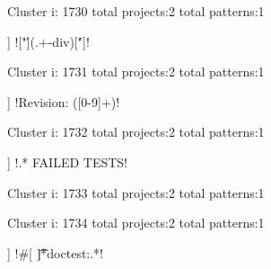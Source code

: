 Cluster i: 1730
total projects:2
total patterns:1
\begin{multicols}{1}
\begin{description}[noitemsep,topsep=0pt]
\item [[2] ] \cverb!["\'](.+-div)[\'"]!
\end{description}
\end{multicols}







Cluster i: 1731
total projects:2
total patterns:1
\begin{multicols}{1}
\begin{description}[noitemsep,topsep=0pt]
\item [[2] ] \cverb!Revision: ([0-9]+)!
\end{description}
\end{multicols}







Cluster i: 1732
total projects:2
total patterns:1
\begin{multicols}{1}
\begin{description}[noitemsep,topsep=0pt]
\item [[2] ] \cverb!.* FAILED TESTS\n!
\end{description}
\end{multicols}







Cluster i: 1733
total projects:2
total patterns:1
\begin{multicols}{1}
\end{multicols}







Cluster i: 1734
total projects:2
total patterns:1
\begin{multicols}{1}
\begin{description}[noitemsep,topsep=0pt]
\item [[2] ] \cverb!#[ \t]*doctest:.*!
\end{description}
\end{multicols}








